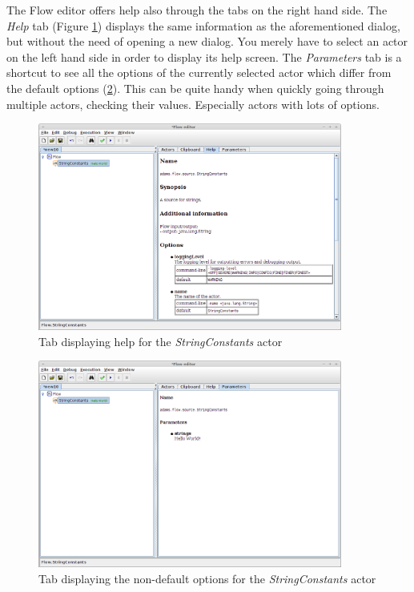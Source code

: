 The Flow editor offers help also through the tabs on the right hand side. The
\textit{Help} tab (Figure \ref{floweditor-helloworld-actorhelp-tab}) displays
the same information as the aforementioned dialog, but without the need of
opening a new dialog. You merely have to select an actor on the left hand side
in order to display its help screen. The \textit{Parameters} tab is a shortcut
to see all the options of the currently selected actor which differ from the
default options (\ref{floweditor-helloworld-actoroptions}). This can be quite
handy when quickly going through multiple actors, checking their values.
Especially actors with lots of options.

\begin{figure}[htb]
  \centering
  \includegraphics[width=10.0cm]{images/floweditor-helloworld-actorhelp-tab.png}
  \caption{Tab displaying help for the \textit{StringConstants} actor}
  \label{floweditor-helloworld-actorhelp-tab}
\end{figure}

\begin{figure}[htb]
  \centering
  \includegraphics[width=10.0cm]{images/floweditor-helloworld-actoroptions.png}
  \caption{Tab displaying the non-default options for the
  \textit{StringConstants} actor}
  \label{floweditor-helloworld-actoroptions}
\end{figure}

